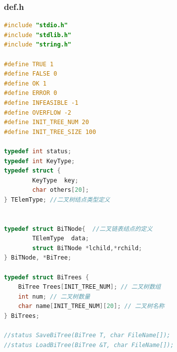 \documentclass[supercite]{Experimental_Report}
\theoremstyle{definition}
\begin{document}
\subsubsection*{def.h}
\begin{lstlisting}[language=C, caption={def.h}, label=lst:def_h_bi]
#include "stdio.h"
#include "stdlib.h"
#include "string.h"

#define TRUE 1
#define FALSE 0
#define OK 1
#define ERROR 0
#define INFEASIBLE -1
#define OVERFLOW -2
#define INIT_TREE_NUM 20
#define INIT_TREE_SIZE 100

typedef int status;
typedef int KeyType; 
typedef struct {
		KeyType  key;
		char others[20];
} TElemType; //二叉树结点类型定义


typedef struct BiTNode{  //二叉链表结点的定义
		TElemType  data;
		struct BiTNode *lchild,*rchild;
} BiTNode, *BiTree;

typedef struct BiTrees {
	BiTree Trees[INIT_TREE_NUM]; // 二叉树数组
	int num; // 二叉树数量
	char name[INIT_TREE_NUM][20]; // 二叉树名称
} BiTrees;

//status SaveBiTree(BiTree T, char FileName[]);
//status LoadBiTree(BiTree &T, char FileName[]);

\end{lstlisting}
\end{document}
